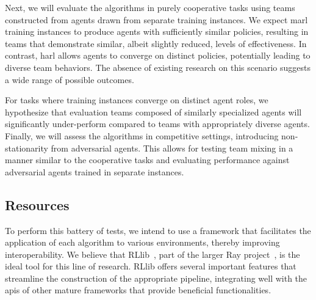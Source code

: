 Next, we will evaluate the algorithms in purely cooperative tasks using teams constructed from 
agents drawn from separate training instances. We expect \gls{marl} training instances to produce 
agents with sufficiently similar policies, resulting in teams that demonstrate similar, 
albeit slightly reduced, levels of effectiveness. In contrast, \gls{harl} allows 
agents to converge on distinct policies, potentially leading to diverse team behaviors. 
The absence of existing research on this scenario suggests a wide range of possible outcomes.

For tasks where training instances converge on distinct agent roles, we hypothesize that evaluation
teams composed of similarly specialized agents will significantly under-perform compared to teams 
with appropriately diverse agents. Finally, we will assess the algorithms in competitive settings, 
introducing non-stationarity from adversarial agents. 
This allows for testing team mixing in a manner similar to the cooperative tasks and 
evaluating performance against adversarial agents trained in separate instances.

\subsection{Resources}
To perform this battery of tests, we intend to use a framework that facilitates the application 
of each algorithm to various environments, thereby improving interoperability. 
We believe that RLlib~\cite{liang2018}, part of the larger Ray project~\cite{zotero-2599}, 
is the ideal tool for this line of research. RLlib offers several important features that 
streamline the construction of the appropriate pipeline, integrating well with the \glspl{api} 
of other mature frameworks that provide beneficial functionalities.

